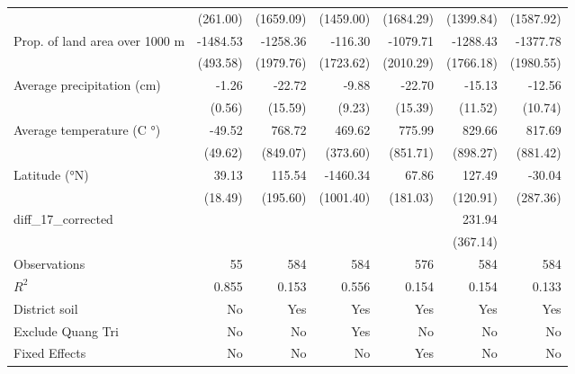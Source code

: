 \begin{table}[htbp]
\begin{tabular}{l*{6}{D{.}{.}{-1}}}
                    &    (261.00)         &   (1659.09)         &   (1459.00)         &   (1684.29)         &   (1399.84)         &   (1587.92)         \\
\addlinespace
Prop. of land area over 1000 m&    -1484.53\sym{***}&    -1258.36         &     -116.30         &    -1079.71         &    -1288.43         &    -1377.78         \\
                    &    (493.58)         &   (1979.76)         &   (1723.62)         &   (2010.29)         &   (1766.18)         &   (1980.55)         \\
\addlinespace
Average precipitation (cm)&       -1.26\sym{**} &      -22.72         &       -9.88         &      -22.70         &      -15.13         &      -12.56         \\
                    &      (0.56)         &     (15.59)         &      (9.23)         &     (15.39)         &     (11.52)         &     (10.74)         \\
\addlinespace
Average temperature (C $°$)&      -49.52         &      768.72         &      469.62         &      775.99         &      829.66         &      817.69         \\
                    &     (49.62)         &    (849.07)         &    (373.60)         &    (851.71)         &    (898.27)         &    (881.42)         \\
\addlinespace
Latitude (°N)       &       39.13\sym{**} &      115.54         &    -1460.34         &       67.86         &      127.49         &      -30.04         \\
                    &     (18.49)         &    (195.60)         &   (1001.40)         &    (181.03)         &    (120.91)         &    (287.36)         \\
\addlinespace
diff\_17\_corrected   &                     &                     &                     &                     &      231.94         &                     \\
                    &                     &                     &                     &                     &    (367.14)         &                     \\
\midrule
Observations        &          55         &         584         &         584         &         576         &         584         &         584         \\
\(R^{2}\)           &       0.855         &       0.153         &       0.556         &       0.154         &       0.154         &       0.133         \\
District soil       &          No         &         Yes         &         Yes         &         Yes         &         Yes         &         Yes         \\
Exclude Quang Tri   &          No         &          No         &         Yes         &          No         &          No         &          No         \\
Fixed Effects       &          No         &          No         &          No         &         Yes         &          No         &          No         \\
\bottomrule
\end{tabular}
\end{table}
